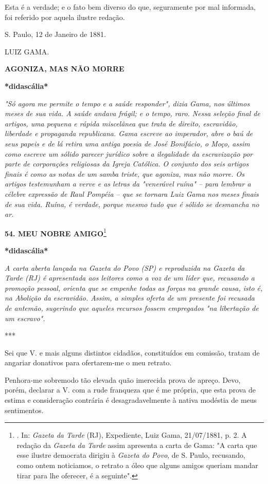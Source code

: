 Esta é a verdade; e o fato bem diverso do que, seguramente por mal
informada, foi referido por aquela ilustre redação.

S. Paulo, 12 de Janeiro de 1881.

LUIZ GAMA.

\textbf{AGONIZA, MAS NÃO MORRE}

\textbf{*didascália*}

\emph{"Só agora me permite o tempo e a saúde responder", dizia Gama, nos
últimos meses de sua vida. A saúde andava frágil; e o tempo, raro. Nessa
seleção final de artigos, uma pequena e rápida miscelânea que trata de
direito, escravidão, liberdade e propaganda republicana. Gama escreve ao
imperador, abre o baú de seus papeis e de lá retira uma antiga poesia de
José Bonifácio, o Moço, assim como escreve um sólido parecer jurídico
sobre a ilegalidade da escravização por parte de corporações religiosas
da Igreja Católica. O conjunto dos seis artigos finais é como as notas
de um samba triste, que agoniza, mas não morre. Os artigos testemunham a
verve e as letras da "venerável ruína" -- para lembrar a célebre
expressão de Raul Pompéia -- que se tornara Luiz Gama nos meses finais
de sua vida. Ruína, é verdade, porque mesmo tudo que é sólido se
desmancha no ar.}

\textbf{54. MEU NOBRE AMIGO}\footnote{. In: \emph{Gazeta da Tarde} (RJ),
  Expediente, Luiz Gama, 21/07/1881, p. 2. A redação da \emph{Gazeta da
  Tarde} assim apresenta a carta de Gama: "A carta que esse ilustre
  democrata dirigiu à \emph{Gazeta do Povo}, de S. Paulo, recusando,
  como ontem noticiamos, o retrato a óleo que alguns amigos queriam
  mandar tirar para lhe oferecer, é a seguinte".}

\textbf{*}\textbf{didascália*}

\emph{A carta aberta lançada na Gazeta do Povo (SP) e reproduzida na
Gazeta da Tarde (RJ) é apresentada aos leitores como a voz de um líder
que, recusando a promoção pessoal, orienta que se empenhe todas as
forças na grande causa, isto é, na Abolição da escravidão. Assim, a
simples oferta de um presente foi recusada de antemão, sugerindo que
aqueles recursos fossem empregados "na libertação de um escravo". }

***

Sei que V. e mais alguns distintos cidadãos, constituídos em comissão,
tratam de angariar donativos para ofertarem-me o meu retrato.

Penhora-me sobremodo tão elevada quão imerecida prova de apreço. Devo,
porém, declarar a V. com a rude franqueza que é me própria, que esta
prova de estima e consideração contrária é desagradavelmente à nativa
modéstia de meus sentimentos.

